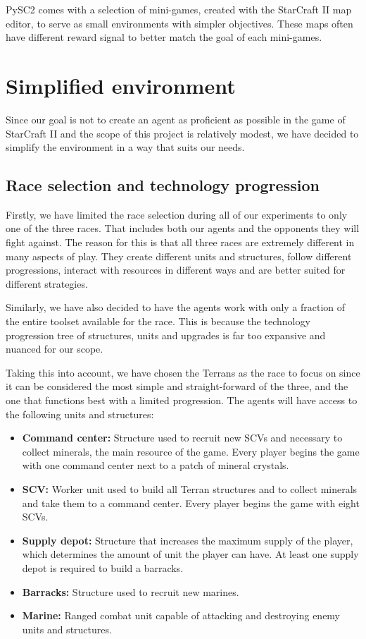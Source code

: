 PySC2 comes with a selection of mini-games, created with the StarCraft II map editor, to serve as small environments with simpler objectives. These maps often have different reward signal to better match the goal of each mini-games.

\section{Simplified environment}

Since our goal is not to create an agent as proficient as possible in the game of StarCraft II and the scope of this project is relatively modest, we have decided to simplify the environment in a way that suits our needs.

\subsection{Race selection and technology progression}

Firstly, we have limited the race selection during all of our experiments to only one of the three races. That includes both our agents and the opponents they will fight against. The reason for this is that all three races are extremely different in many aspects of play. They create different units and structures, follow different progressions, interact with resources in different ways and are better suited for different strategies.

Similarly, we have also decided to have the agents work with only a fraction of the entire toolset available for the race. This is because the technology progression tree of structures, units and upgrades is far too expansive and nuanced for our scope.

Taking this into account, we have chosen the Terrans as the race to focus on since it can be considered the most simple and straight-forward of the three, and the one that functions best with a limited progression. The agents will have access to the following units and structures:

\begin{itemize}
    \item \textbf{Command center:} Structure used to recruit new SCVs and necessary to collect minerals, the main resource of the game. Every player begins the game with one command center next to a patch of mineral crystals.
    \item \textbf{SCV:} Worker unit used to build all Terran structures and to collect minerals and take them to a command center. Every player begins the game with eight SCVs.
    \item \textbf{Supply depot:} Structure that increases the maximum supply of the player, which determines the amount of unit the player can have. At least one supply depot is required to build a barracks.
    \item \textbf{Barracks:} Structure used to recruit new marines.
    \item \textbf{Marine:} Ranged combat unit capable of attacking and destroying enemy units and structures.
\end{itemize}

